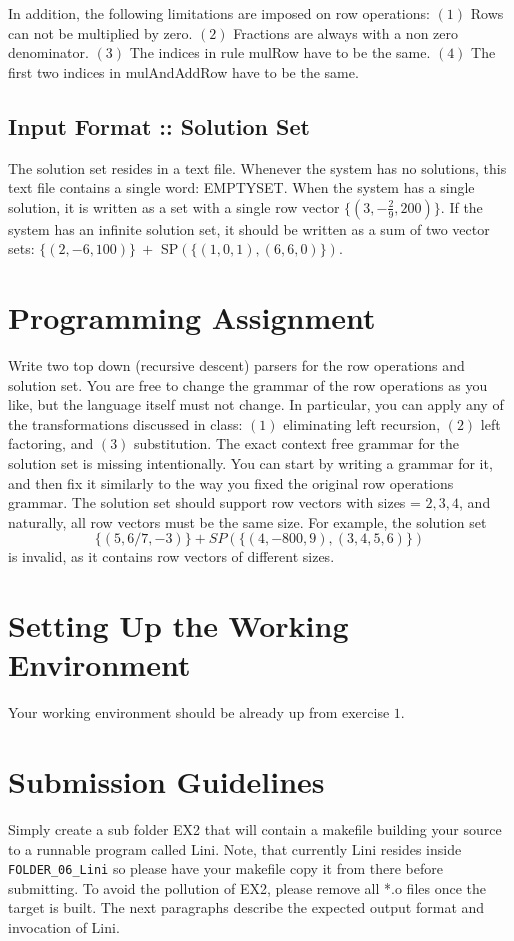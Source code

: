 \documentclass{article}
\begin{document}
In addition, the following limitations are imposed on row operations:
$(1)$ Rows can not be multiplied by zero.
$(2)$ Fractions are always with a non zero denominator.
$(3)$ The indices in rule mulRow have to be the same.
$(4)$ The first two indices in mulAndAddRow have to be the same.

\subsection*{Input Format :: Solution Set}
The solution set resides in a text file.
Whenever the system has no solutions, this text file contains a single word:
EMPTYSET. When the system has a single solution, it is written as a set 
with a single row vector $\{(3,-\frac{2}{9},200)\}$. If the system has an infinite
solution set, it should be written as a sum of two vector sets:
$\{(2,-6,100)\} ~ +$ SP$(\{(1,0,1), (6,6,0)\})$.

\section{Programming Assignment}
Write two top down (recursive descent) parsers for the row operations and solution set.
You are free to change the grammar of the row operations as you like,
but the language itself must not change. In particular, you can apply any of the transformations discussed in class:
$(1)$ eliminating left recursion,
$(2)$ left factoring, and
$(3)$ substitution.
The exact context free grammar for the solution set is missing intentionally.
You can start by writing a grammar for it, and then fix it similarly
to the way you fixed the original row operations grammar.
The solution set should support row vectors with sizes = $2,3,4$,
and naturally, all row vectors must be the same size.
For example, the solution set
\[
\{(5,6/7,-3)\}+SP(\{(4,-800,9),(3,4,5,6)\})
\]
is invalid, as it contains row vectors of different sizes.

\section{Setting Up the Working Environment}
Your working environment should be already up from exercise $1$.

\section{Submission Guidelines}
Simply create a sub folder EX2 that will contain a makefile building
your source to a runnable program called Lini.
Note, that currently Lini resides inside \verb"FOLDER_06_Lini" so please have your makefile copy it from there before submitting.
To avoid the pollution of EX2, please remove all *.o files once the target is built.
The next paragraphs describe the expected output format and invocation of Lini.
\end{document}
